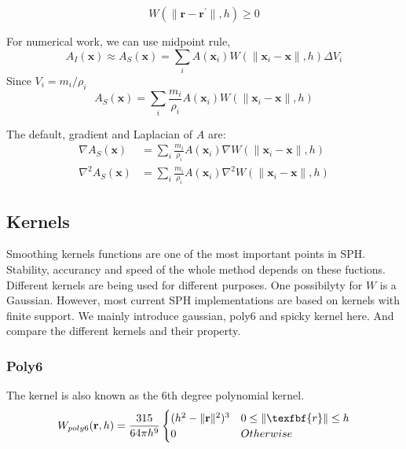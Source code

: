     \begin{equation}
        W(\|\textbf{r} - \textbf{r}^{\prime}\|, h) \ge 0
    \end{equation}

    For numerical work, we can use midpoint rule,
    \begin{equation}
        A_{I}(\textbf{x}) \approx A_{S}(\textbf{x}) = \sum_{i} A(\textbf{x}_{i})W(\|\textbf{x}_{i}-\textbf{x}\|, h)\Delta V_{i}
    \end{equation}
    Since $V_{i} = m_{i}/\rho _{i}$
    \begin{equation}
        A_{S}(\textbf{x}) = \sum_{i} \frac{m_{i}}{\rho_{i}} A(\textbf{x}_{i})W(\|\textbf{x}_{i}-\textbf{x}\|, h)
    \end{equation}

    The default, gradient and Laplacian of $A$ are:
    \begin{equation}
        \begin{aligned}
        \nabla A_{S}(\textbf{x}) &= \sum_{i} \frac{m_{i}}{\rho_{i}} A(\textbf{x}_{i})\nabla W(\|\textbf{x}_{i}-\textbf{x}\|, h) \\
        \nabla^{2} A_{S}(\textbf{x}) &= \sum_{i} \frac{m_{i}}{\rho_{i}} A(\textbf{x}_{i})\nabla^{2} W(\|\textbf{x}_{i}-\textbf{x}\|, h)
        \end{aligned}
        \label{eq_all}
    \end{equation}

    \subsection{Kernels}
    Smoothing kernels functions are one of the most important points in SPH. Stability, accurancy and speed of the whole method depends on these fuctions. Different kernels are being used for different purposes. One possibilyty for $W$ is a Gaussian. However, most current SPH implementations are based on kernels with finite support. We mainly introduce gaussian, poly6 and spicky kernel here. And compare the different kernels and their property.

    \subsubsection{Poly6}
    The kernel is also known as the 6th degree polynomial kernel.
    \begin{equation}
        W_{poly6}(\textbf{r}, h) = \frac{315}{64\pi h^{9}}
            \begin{cases}
                (h^2 - \|\textbf{r}\|^2)^3 & 0\le\|\texfbf{r}\|\le h \\
                0 & Otherwise
            \end{cases}
    \end{equation}

